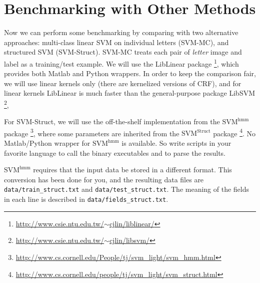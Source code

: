 \documentclass[11pt]{report}
\begin{document}
\section{Benchmarking with Other Methods}

Now we can perform some benchmarking by comparing with two alternative approaches:
multi-class linear SVM on individual letters (SVM-MC),
and structured SVM (SVM-Struct).
SVM-MC treats each pair of \emph{letter} image and label as a training/test example.
We will use the LibLinear package%
\footnote{\href{http://www.csie.ntu.edu.tw/~cjlin/liblinear/}{http://www.csie.ntu.edu.tw/$\sim$cjlin/liblinear/}},
which provides both Matlab and Python wrappers.
In order to keep the comparison fair,
we will use linear kernels only (there are kernelized versions of CRF),
and for linear kernels LibLinear is much faster than the general-purpose package LibSVM%
\footnote{\href{http://www.csie.ntu.edu.tw/~cjlin/libsvm/}{http://www.csie.ntu.edu.tw/$\sim$cjlin/libsvm/}},


For SVM-Struct, we will use the off-the-shelf implementation from the $\text{SVM}^{\text{hmm}}$ package%
\footnote{\href{http://www.cs.cornell.edu/People/tj/svm_light/svm_hmm.html}{http://www.cs.cornell.edu/People/tj/svm\_light/svm\_hmm.html}},
where some parameters are inherited from the $\text{SVM}^{\text{Struct}}$ package%
\footnote{\href{http://www.cs.cornell.edu/people/tj/svm_light/svm_struct.html}{http://www.cs.cornell.edu/people/tj/svm\_light/svm\_struct.html}}.
No Matlab/Python wrapper for $\text{SVM}^{\text{hmm}}$ is available.
So write scripts in your favorite language to call the binary executables and to parse the results.


$\text{SVM}^{\text{hmm}}$ requires that the input data be stored in a different format.
This conversion has been done for you, and the resulting data files are \verb#data/train_struct.txt# and \verb#data/test_struct.txt#.
The meaning of the fields in each line is described in \verb#data/fields_struct.txt#.
\end{document}
